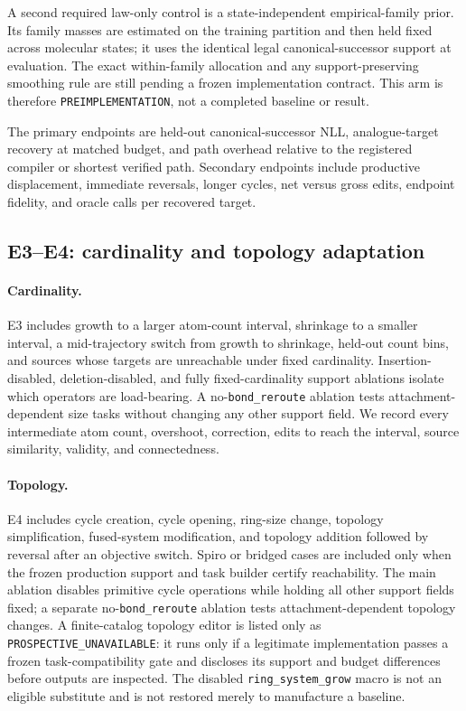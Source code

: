 A second required law-only control is a state-independent empirical-family
prior. Its family masses are estimated on the training partition and then held
fixed across molecular states; it uses the identical legal canonical-successor
support at evaluation. The exact within-family allocation and any
support-preserving smoothing rule are still pending a frozen implementation
contract. This arm is therefore \texttt{PREIMPLEMENTATION}, not a completed
baseline or result.

The primary endpoints are held-out canonical-successor NLL, analogue-target
recovery at matched budget, and path overhead relative to the registered
compiler or shortest verified path. Secondary endpoints include productive
displacement, immediate reversals, longer cycles, net versus gross edits,
endpoint fidelity, and oracle calls per recovered target.

\subsection{E3--E4: cardinality and topology adaptation}

\paragraph{Cardinality.}
E3 includes growth to a larger atom-count interval, shrinkage to a smaller
interval, a mid-trajectory switch from growth to shrinkage, held-out count
bins, and sources whose targets are unreachable under fixed cardinality.
Insertion-disabled, deletion-disabled, and fully fixed-cardinality support
ablations isolate which operators are load-bearing. A no-\texttt{bond\_reroute}
ablation tests attachment-dependent size tasks without changing any other
support field. We record every intermediate atom count, overshoot, correction,
edits to reach the interval, source similarity, validity, and connectedness.

\paragraph{Topology.}
E4 includes cycle creation, cycle opening, ring-size change, topology
simplification, fused-system modification, and topology addition followed by
reversal after an objective switch. Spiro or bridged cases are included only
when the frozen production support and task builder certify reachability. The
main ablation disables primitive cycle operations while holding all other
support fields fixed; a separate no-\texttt{bond\_reroute} ablation tests
attachment-dependent topology changes. A finite-catalog topology editor is
listed only as \texttt{PROSPECTIVE\_UNAVAILABLE}: it runs only if a legitimate
implementation passes a frozen task-compatibility gate and discloses its
support and budget differences before outputs are inspected. The disabled
\texttt{ring\_system\_grow} macro is not an eligible substitute and is not
restored merely to manufacture a baseline.

